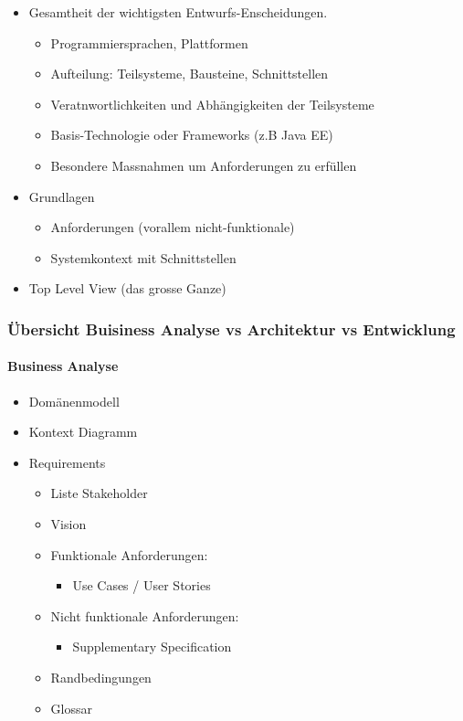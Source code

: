 \documentclass[../ZF_SWEN1.tex]{subfiles}
\begin{document}
\begin{itemize}
	\item Gesamtheit der wichtigsten Entwurfs-Enscheidungen.
	\begin{itemize}
		\item Programmiersprachen, Plattformen
		\item Aufteilung: Teilsysteme, Bausteine, Schnittstellen
		\item Veratnwortlichkeiten und Abhängigkeiten der Teilsysteme
		\item Basis-Technologie oder Frameworks (z.B Java EE)
		\item Besondere Massnahmen um Anforderungen zu erfüllen
	\end{itemize}
	\item Grundlagen
	\begin{itemize}
		\item Anforderungen (vorallem nicht-funktionale)
		\item Systemkontext mit Schnittstellen
	\end{itemize}
	\item Top Level View (das grosse Ganze)
\end{itemize}

\subsubsection{Übersicht Buisiness Analyse vs Architektur vs Entwicklung}

\paragraph{Business Analyse}
\begin{itemize}
	\item Domänenmodell
	\item Kontext Diagramm
	\item Requirements
	\begin{itemize}
		\item Liste Stakeholder
		\item Vision
		\item Funktionale Anforderungen:
		\begin{itemize}
			\item Use Cases / User Stories
		\end{itemize}
		\item Nicht funktionale Anforderungen:
		\begin{itemize}
			\item Supplementary Specification
		\end{itemize}
		\item Randbedingungen
		\item Glossar
	\end{itemize}
\end{itemize}
\end{document}
